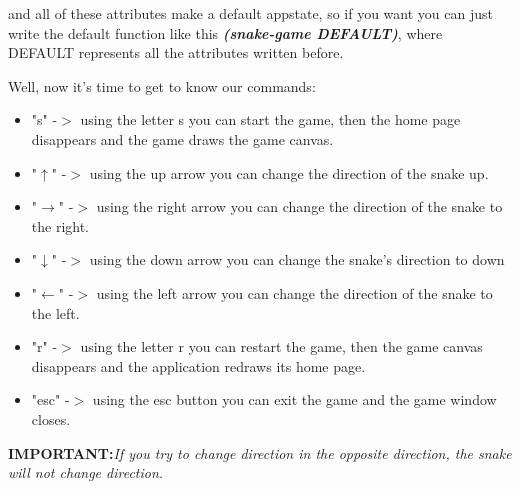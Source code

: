\documentclass{article}
\begin{document}
	\noindent and all of these attributes make a default appstate, so if you want you can just write the default function like this \textbf{\emph{(snake-game DEFAULT)}}, where DEFAULT represents all the attributes written before.

	Well, now it's time to get to know our commands:
	
	\begin{itemize}
		\item "s" -$>$ using the letter s you can start the game, then the home page disappears and the game draws the game canvas.
		\item "$\uparrow$" -$>$ using the up arrow you can change the direction of the snake up.
		\item "$\rightarrow$" -$>$ using the right arrow you can change the direction of the snake to the right.
		\item "$\downarrow$" -$>$ using the down arrow you can change the snake's direction to down
		\item "$\leftarrow$" -$>$ using the left arrow you can change the direction of the snake to the left.
		\item "r" -$>$ using the letter r you can restart the game, then the game canvas disappears and the application redraws its home page.
		\item "esc" -$>$ using the esc button you can exit the game and the game window closes.
	\end{itemize}
	
	\noindent\large{\textbf{IMPORTANT:}}\emph{If you try to change direction in the opposite direction, the snake will not change direction.}
\end{document}
